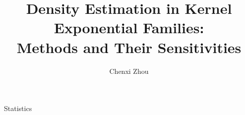 \documentclass{osudissert96}
\begin{document}
%
%

\author{Chenxi Zhou}
\title{Density Estimation in Kernel Exponential Families: \\ Methods and Their Sensitivities}

\unit{Statistics}



%
%

\maketitle

%
%
%
%
%

\disscopyright

%
%

\begin{abstract}
  
\end{abstract}


%
%
%
\end{document}
